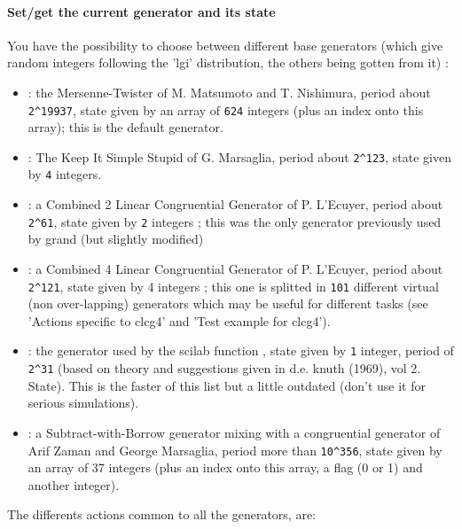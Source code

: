 \paragraph{Set/get the current generator and its state}
You have the possibility to choose between different base 
generators (which give random integers following the 'lgi' distribution, the others 
being gotten from it) :
\begin{itemize}
\item {} : the Mersenne-Twister of M. Matsumoto and T. Nishimura, period about \verb!2^19937!, 
  state given by an array of \verb!624! integers (plus an index onto this array); this  
  is the default generator.
\item {} : The Keep It Simple Stupid of G. Marsaglia,  period about \verb!2^123!,
  state given by \verb!4! integers.
\item {} : a Combined 2 Linear Congruential Generator of P. L'Ecuyer,
  period about \verb!2^61!, state given by \verb!2! integers ; this was 
  the only generator previously used by grand (but slightly modified)
\item {} : a Combined 4 Linear Congruential Generator of P. L'Ecuyer,
  period about \verb!2^121!, state given by 4 integers ; this one is 
  splitted in \verb!101! different virtual (non over-lapping) generators 
  which may be useful for different tasks (see 'Actions specific to clcg4' and
  'Test example for clcg4').
\item {} : the generator used by the scilab function  , state
  given by \verb!1! integer, period of \verb!2^31! (based  on  theory  
  and suggestions  given  in  d.e. knuth (1969),  vol  2. State). This
  is the faster of this list but a little outdated (don't use it for
  serious simulations).
\item {} : a Subtract-with-Borrow generator mixing with a congruential
  generator of Arif Zaman and George Marsaglia, period more than \verb!10^356!,
  state given by an array of 37 integers (plus an index onto this array, a flag (0 or 1)
  and another integer). 
\end{itemize}
The differents actions common to all the generators, are:
